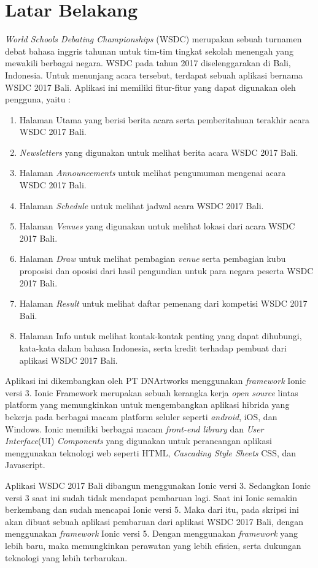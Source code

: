 \documentclass[a4paper,twoside]{article}
\begin{document}
\section{Latar Belakang}
\textit{World Schools Debating Championships} (WSDC) merupakan sebuah turnamen debat bahasa inggris tahunan untuk tim-tim tingkat sekolah menengah yang mewakili berbagai negara. WSDC pada tahun 2017 diselenggarakan di Bali, Indonesia. Untuk menunjang acara tersebut, terdapat sebuah aplikasi bernama WSDC 2017 Bali. Aplikasi ini memiliki fitur-fitur yang dapat digunakan oleh pengguna, yaitu : 

\begin{enumerate}
	\item Halaman Utama yang berisi berita acara serta pemberitahuan terakhir acara WSDC 2017 Bali.
	\item \textit{Newsletters} yang digunakan untuk melihat berita acara WSDC 2017 Bali.
	\item Halaman \textit{Announcements} untuk melihat pengumuman mengenai acara WSDC 2017 Bali.
	\item Halaman \textit{Schedule} untuk melihat jadwal acara WSDC 2017 Bali.
	\item Halaman \textit{Venues} yang digunakan untuk melihat lokasi dari acara WSDC 2017 Bali.
	\item Halaman \textit{Draw} untuk melihat pembagian \textit{venue} serta pembagian kubu proposisi dan oposisi dari hasil pengundian untuk para negara peserta WSDC 2017 Bali.
	\item Halaman \textit{Result} untuk melihat daftar pemenang dari kompetisi WSDC 2017 Bali. 
	\item Halaman Info untuk melihat kontak-kontak penting yang dapat dihubungi, kata-kata dalam bahasa Indonesia, serta kredit terhadap pembuat dari aplikasi WSDC 2017 Bali.
\end{enumerate}

Aplikasi ini dikembangkan oleh PT DNArtworks menggunakan \textit{framework} Ionic versi 3. Ionic Framework merupakan sebuah kerangka kerja {\it open source} lintas platform yang memungkinkan untuk mengembangkan aplikasi hibrida yang bekerja pada berbagai macam platform seluler seperti {\it android}, iOS, dan Windows. Ionic memiliki berbagai macam \textit{front-end library} dan \textit{User Interface}(UI) {\it Components} yang digunakan untuk  perancangan aplikasi menggunakan teknologi web seperti HTML, {\it Cascading Style Sheets} CSS, dan Javascript. 

Aplikasi WSDC 2017 Bali dibangun menggunakan Ionic versi 3. Sedangkan Ionic versi 3 saat ini sudah tidak mendapat pembaruan lagi. Saat ini Ionic semakin berkembang dan sudah mencapai Ionic versi 5. Maka dari itu, pada skripsi ini akan dibuat sebuah aplikasi pembaruan dari aplikasi WSDC 2017 Bali, dengan menggunakan \textit{framework} Ionic versi 5. Dengan menggunakan \textit{framework} yang lebih baru, maka memungkinkan perawatan yang lebih efisien, serta dukungan teknologi yang lebih terbarukan.
\end{document}
